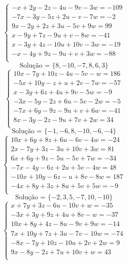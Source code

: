 \documentclass[12pt,oneside,a4paper]{article}
\begin{document}
\vspace{\baselineskip}
\begin{equation*}
\begin{cases}
-x+2y-2z-4u-9v-3w=-109 \\
-7x-3y-5z+2u-v-7w=-2 \\
9x-2y+2z+3u-5v+9w=99 \\
x-9y+7z-9u+v-8w=-41 \\
x-3y+4z-10u+10v-3w=-19 \\
-x-4y+9z-9u+v+3w=-88 \\
\end{cases}
\end{equation*}
\begin{equation*}
\text{Solução = }\{8,-10,-7,8,6,3\}
\end{equation*}
\vspace{\baselineskip}
\begin{equation*}
\begin{cases}
10x-7y+10z-4u-5v-w=186 \\
-5x+10y-z+u+2v-7w=-57 \\
x-3y+6z+4u+9v-5w=-9 \\
-3x-5y-2z+6u-5v-2w=-5 \\
-7x+6y-9z-9u+v+6w=-41 \\
8x-3y-2z-9u+7v+2w=34 \\
\end{cases}
\end{equation*}
\begin{equation*}
\text{Solução = }\{-1,-6,8,-10,-6,-4\}
\end{equation*}
\vspace{\baselineskip}
\begin{equation*}
\begin{cases}
10x+6y+8z+6u-6v-4w=-24 \\
2x-7y+3z-3u+10v+3w=81 \\
6x+6y+9z-5u-5v+7w=-34 \\
-7x-4y-6z+2u+5v-4w=48 \\
-10x+10y-6z-u+8v-8w=187 \\
-4x+8y+3z+8u+5v+5w=-9 \\
\end{cases}
\end{equation*}
\begin{equation*}
\text{Solução = }\{-2,3,5,-7,10,-10\}
\end{equation*}
\vspace{\baselineskip}
\begin{equation*}
\begin{cases}
x+7y+3z-6u-10v+w=-35 \\
-3x+3y+9z+4u+8v-w=-37 \\
10x+8y+4z-8u-9v+9w=-14 \\
7x+10y+7z+3u-7v-10w=-74 \\
-8x-7y+10z-10u+2v+2w=9 \\
9x-8y-2z+7u+10v+w=43 \\
\end{cases}
\end{equation*}
\end{document}
